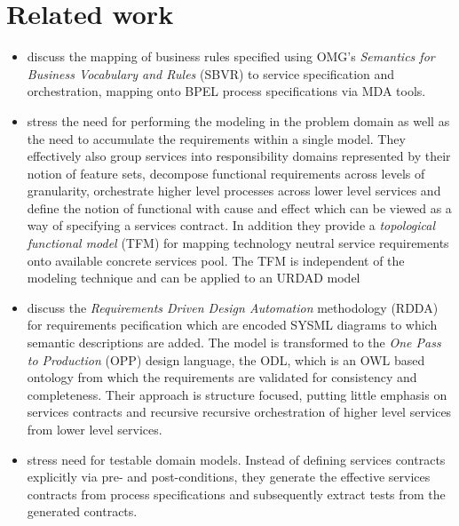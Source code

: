 \section{Related work \label{sec:relatedWork}}

\begin{itemize}
 \item \cite{iacob_model-driven_2008} discuss the mapping of business rules specified using OMG's {\em Semantics for Business Vocabulary and Rules} (SBVR) to service specification and orchestration, mapping onto BPEL process specifications via MDA tools.

  \item \cite{asnina_computation_2010} stress the need for performing the modeling in the problem domain as well as the need to accumulate the requirements within a single model. They effectively also group services into responsibility domains represented by their notion of feature sets, decompose functional requirements across levels of granularity, orchestrate higher level processes across lower level services and define the notion of functional with cause and effect which can be viewed as a way of specifying a services contract. In addition they provide a {\em topological functional model} (TFM) for mapping technology neutral service requirements onto available concrete services pool. The TFM is independent of the modeling technique and can be applied to an URDAD model

  \item \cite{cardei_model_2008} discuss the {\em Requirements Driven Design Automation} methodology (RDDA) for requirements pecification which are encoded SYSML diagrams to which semantic descriptions are added. The model is transformed to the {\em One Pass to Production} (OPP) design language, the ODL, which is an OWL based ontology from which the requirements are validated for consistency and completeness. Their approach is structure focused, putting little emphasis on services contracts and recursive recursive orchestration of higher level services from lower level services.

  \item \cite{bashardoust-tajali_extracting_2008} stress need for testable domain models. Instead of defining services contracts explicitly via pre- and post-conditions, they generate the effective services contracts from process specifications and subsequently extract tests from the generated contracts.

\end{itemize}
